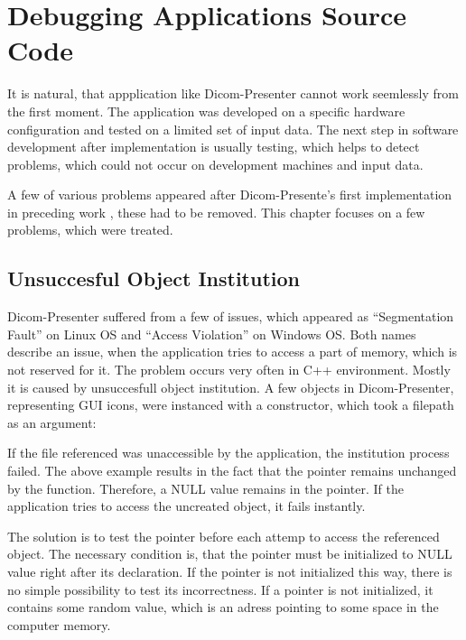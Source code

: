 \chapter{Debugging Applications Source Code}
\vspace{-10mm}
It is natural, that appplication like Dicom-Presenter cannot work seemlessly from the first moment. The application was developed on a specific hardware configuration and tested on a limited set of input data. The next step in software development after implementation is usually testing, which helps to detect problems, which could not occur on development machines and input data.

A few of various problems appeared after Dicom-Presente's first implementation in preceding work \cite{neskudla}, these had to be removed. This chapter focuses on a few problems, which were treated.

\section{Unsuccesful Object Institution}
Dicom-Presenter suffered from a few of issues, which appeared as ``Segmentation Fault'' on Linux OS and ``Access Violation'' on Windows OS. Both names describe an issue, when the application tries to access a part of memory, which is not reserved for it. The problem occurs very often in C++ environment. Mostly it is caused by unsuccesfull object institution. A few objects in Dicom-Presenter, representing GUI icons, were instanced with a constructor, which took a filepath as an argument:


If the file referenced was unaccessible by the application, the institution process failed. The above example results in the fact that the  pointer remains unchanged by the  function. Therefore, a NULL value remains in the pointer. If the application tries to access the uncreated object, it fails instantly.

The solution is to test the pointer before each attemp to access the referenced object. The necessary condition is, that the pointer  must be initialized to NULL value right after its declaration. If the pointer is not initialized this way, there is no simple possibility to test its incorrectness. If a pointer is not initialized, it contains some random value, which is an adress pointing to some space in the computer memory.


